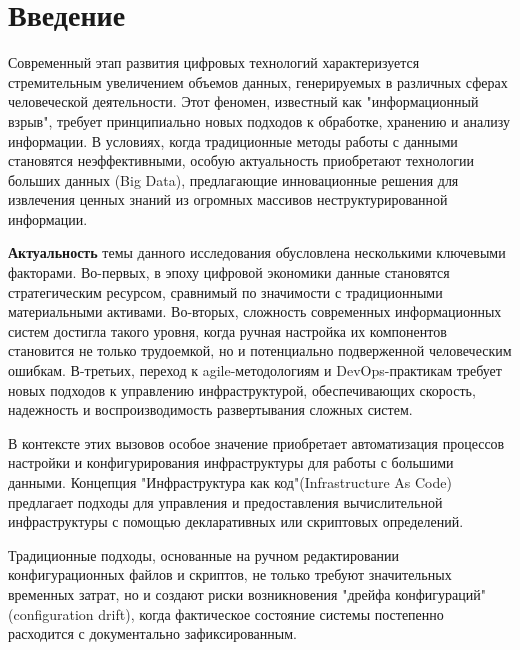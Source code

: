 \chapter*{Введение} %
Современный этап развития цифровых технологий характеризуется стремительным увеличением объемов данных, генерируемых в различных сферах человеческой деятельности. Этот феномен, известный как "информационный взрыв", требует принципиально новых подходов к обработке, хранению и анализу информации. В условиях, когда традиционные методы работы с данными становятся неэффективными, особую актуальность приобретают технологии больших данных (Big Data), предлагающие инновационные решения для извлечения ценных знаний из огромных массивов неструктурированной информации\cite{mayer_big_data}.

\textbf{Актуальность} темы данного исследования обусловлена несколькими ключевыми факторами. Во-первых, в эпоху цифровой экономики данные становятся стратегическим ресурсом, сравнимый по значимости с традиционными материальными активами\cite{barr_big_data}. Во-вторых, сложность современных информационных систем достигла такого уровня, когда ручная настройка их компонентов становится не только трудоемкой, но и потенциально подверженной человеческим ошибкам. В-третьих, переход к agile-методологиям и DevOps-практикам требует новых подходов к управлению инфраструктурой, обеспечивающих скорость, надежность и воспроизводимость развертывания сложных систем\cite{tanen_distr}.

В контексте этих вызовов особое значение приобретает автоматизация процессов настройки и конфигурирования инфраструктуры для работы с большими данными. Концепция "Инфраструктура как код"(Infrastructure As Code)\cite{morris_infra} предлагает подходы для управления и предоставления вычислительной инфраструктуры с помощью декларативных или скриптовых определений.

Традиционные подходы, основанные на ручном редактировании конфигурационных файлов и скриптов, не только требуют значительных временных затрат, но и создают риски возникновения "дрейфа конфигураций" (configuration drift)\cite{hambl_cicd}, когда фактическое состояние системы постепенно расходится с документально зафиксированным.




